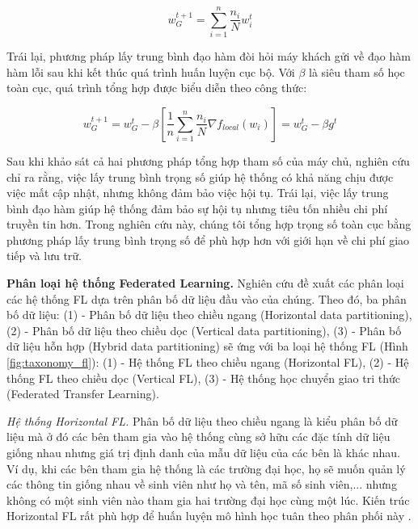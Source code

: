 \begin{equation}
    w_G^{t+1} = \sum_{i=1}^n{\frac{n_i}{N} w_i^t}
\end{equation}

Trái lại, phương pháp lấy trung bình đạo hàm đòi hỏi máy khách gửi về đạo hàm hàm lỗi sau khi kết thúc quá trình huấn luyện cục bộ. Với $\beta$ là siêu tham số học toàn cục, quá trình tổng hợp được biểu diễn theo công thức:

\begin{dmath}
    w_G^{t+1} = w_G^t - \beta \left[ \frac{1}{n} \sum_{i=1}^n{\frac{n_i}{N} \nabla f_{local}(w_i)} \right]
        = w_G^t - \beta g^t
\end{dmath}

Sau khi khảo sát cả hai phương pháp tổng hợp tham số của máy chủ, nghiên cứu \cite{yin2021comprehensive} chỉ ra rằng, việc lấy trung bình trọng số giúp hệ thống có khả năng chịu được việc mất cập nhật, nhưng không đảm bảo việc hội tụ. Trái lại, việc lấy trung bình đạo hàm giúp hệ thống đảm bảo sự hội tụ nhưng tiêu tốn nhiều chi phí truyền tin hơn. Trong nghiên cứu này, chúng tôi tổng hợp trọng số toàn cục bằng phương pháp lấy trung bình trọng số để phù hợp hơn với giới hạn về chi phí giao tiếp và lưu trữ.

\textbf{Phân loại hệ thống Federated Learning.} Nghiên cứu \cite{yin2021comprehensive} đề xuất các phân loại các hệ thống FL dựa trên phân bố dữ liệu đầu vào của chúng. Theo đó, ba phân bố dữ liệu: (1) - Phân bố dữ liệu theo chiều ngang (Horizontal data partitioning), (2) - Phân bố dữ liệu theo chiều dọc (Vertical data partitioning), (3) - Phân bố dữ liệu hỗn hợp (Hybrid data partitioning) sẽ ứng với ba loại hệ thống FL (Hình \ref{fig:taxonomy_fl}): (1) - Hệ thống FL theo chiều ngang (Horizontal FL), (2) - Hệ thống FL theo chiều dọc (Vertical FL), (3) - Hệ thống học chuyển giao tri thức (Federated Transfer Learning).

\textit{Hệ thống Horizontal FL.} Phân bố dữ liệu theo chiều ngang là kiểu phân bố dữ liệu mà ở đó các bên tham gia vào hệ thống cùng sở hữu các đặc tính dữ liệu giống nhau nhưng giá trị định danh của mẫu dữ liệu của các bên là khác nhau. Ví dụ, khi các bên tham gia hệ thống là các trường đại học, họ sẽ muốn quản lý các thông tin giống nhau về sinh viên như họ và tên, mã số sinh viên,... nhưng không có một sinh viên nào tham gia hai trường đại học cùng một lúc. Kiến trúc Horizontal FL rất phù hợp để huấn luyện mô hình học tuân theo phân phối này \cite{yin2021comprehensive}.

